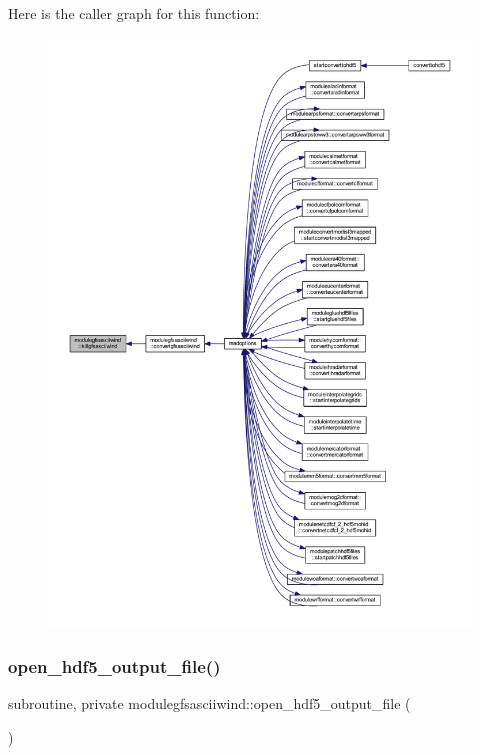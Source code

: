Here is the caller graph for this function\+:\nopagebreak
\begin{figure}[H]
\begin{center}
\leavevmode
\includegraphics[width=350pt]{namespacemodulegfsasciiwind_af8a728ba2b355e73d4c07f7d2a55c500_icgraph}
\end{center}
\end{figure}
\mbox{\label{namespacemodulegfsasciiwind_ac0e8ece9bfc11aa5ca290d333ad96a29}} 
\subsubsection{\texorpdfstring{open\+\_\+hdf5\+\_\+output\+\_\+file()}{open\_hdf5\_output\_file()}}
{\footnotesize\ttfamily subroutine, private modulegfsasciiwind\+::open\+\_\+hdf5\+\_\+output\+\_\+file (\begin{DoxyParamCaption}{ }\end{DoxyParamCaption})\hspace{0.3cm}{\ttfamily [private]}}

